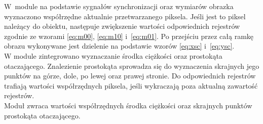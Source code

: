 W~module na podstawie sygnałów synchronizacji oraz wymiarów obrazka wyznaczono współrzędne aktualnie przetwarzanego piksela. Jeśli jest to piksel należący do obiektu, następuje zwiększenie wartości odpowiednich rejestrów zgodnie ze wzorami
\ref{eq:m00}, \ref{eq:m10} i~\ref{eq:m01}. Po przejściu przez całą ramkę obrazu wykonywane jest dzielenie na podstawie wzorów \ref{eq:xsc} i~\ref{eq:ysc}.\\
W module zintegrowano wyznaczanie środka ciężkości oraz prostokąta otaczającego. Znalezienie prostokąta sprowadza się do wyznaczenia skrajnych jego punktów na górze, dole, po lewej oraz prawej stronie. Do odpowiednich rejestrów trafiają wartości współrzędnych piksela, jeśli wykraczają poza aktualną zawartość rejestrów.\\
Moduł zwraca wartości współrzędnych środka ciężkości oraz skrajnych punktów prostokąta otaczającego.
